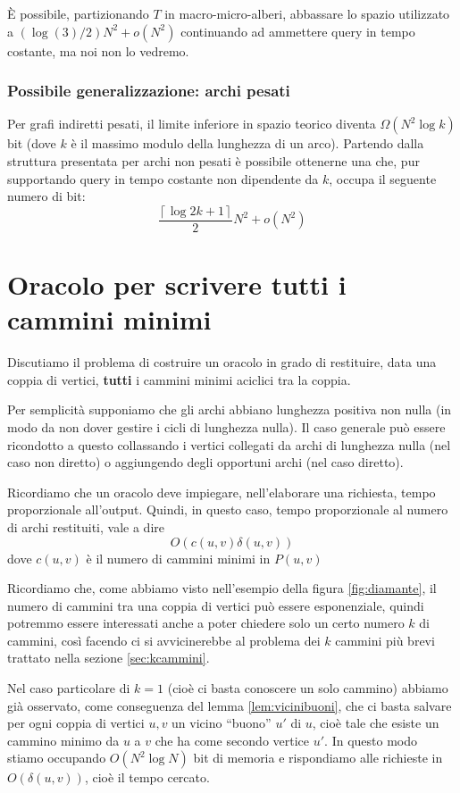 \documentclass[a4paper,10pt]{amsbook}
\theoremstyle{plain}
\theoremstyle{definition}
\theoremstyle{remark}
\newcommand{\pa}[1]{\left(#1\right)}
\newcommand{\ceil}[1]{\left\lceil#1\right\rceil}
\begin{document}
\`E possibile, partizionando $T$ in macro-micro-alberi, abbassare lo
spazio utilizzato a $\pa{\log\pa{3} /2} N^2 + o(N^2)$ continuando ad
ammettere query in tempo costante, ma noi non lo vedremo.

\subsection{Possibile generalizzazione: archi pesati}

Per grafi indiretti pesati, il limite inferiore in spazio teorico
diventa $\Omega\pa{ N^2 \log k}$ bit (dove $k$ è il massimo modulo
della lunghezza di un arco). Partendo dalla struttura presentata per
archi non pesati \`e possibile ottenerne una che, pur supportando
query in tempo costante non dipendente da $k$, occupa il seguente
numero di bit:
\[ \frac{ \ceil { \log{2k+1} } }{2} N^2 + o(N^2) \]

\chapter{Oracolo per scrivere tutti i cammini minimi}
\label{chap:oracolotutticammini}

Discutiamo il problema di costruire un oracolo in grado di restituire,
data una coppia di vertici, \textbf{tutti} i cammini minimi aciclici
tra la coppia.

Per semplicit\`a supponiamo che gli archi abbiano lunghezza positiva
non nulla (in modo da non dover gestire i cicli di lunghezza
nulla). Il caso generale pu\`o essere ricondotto a questo collassando
i vertici collegati da archi di lunghezza nulla (nel caso non diretto)
o aggiungendo degli opportuni archi (nel caso diretto).

Ricordiamo che un oracolo deve impiegare, nell'elaborare una
richiesta, tempo proporzionale all'output. Quindi, in questo caso,
tempo proporzionale al numero di archi restituiti, vale a dire
\[ O\pa{ c(u,v) \delta (u,v) } \]
dove $c(u,v)$ \`e il numero di cammini minimi in $P(u,v)$

Ricordiamo che, come abbiamo visto nell'esempio della figura
\ref{fig:diamante}, il numero di cammini tra una coppia di vertici
pu\`o essere esponenziale, quindi potremmo essere interessati anche a
poter chiedere solo un certo numero $k$ di cammini, cos\`i facendo ci
si avvicinerebbe al problema dei $k$ cammini pi\`u brevi trattato
nella sezione \ref{sec:kcammini}.

Nel caso particolare di $k=1$ (cio\`e ci basta conoscere un solo
cammino) abbiamo gi\`a osservato, come conseguenza del lemma
\ref{lem:vicinibuoni}, che ci basta salvare per ogni coppia di vertici
$u,v$ un vicino ``buono'' $u'$ di $u$, cio\`e tale che esiste un
cammino minimo da $u$ a $v$ che ha come secondo vertice $u'$. In
questo modo stiamo occupando $O\pa{N^2 \log N}$ bit di memoria e
rispondiamo alle richieste in $O\pa{ \delta\pa{u,v}}$, cio\`e il tempo
cercato.
\end{document}

